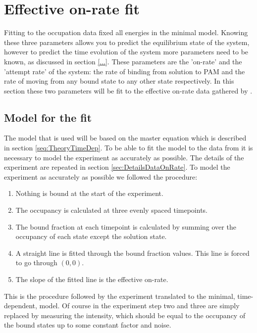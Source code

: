 \section{Effective on-rate fit}

Fitting to the occupation data fixed all energies in the minimal model. Knowing these three parameters allows you to predict the equilibrium state of the system, however to predict the time evolution of the system more parameters need to be known, as discussed in section \ref{...}. %
These parameters are the 'on-rate' and the 'attempt rate' of the system: the rate of binding from solution to PAM and the rate of moving from any bound state to any other state respectively. In this section these two parameters will be fit to the effective on-rate data gathered by \cite{PNAS}.


\subsection{Model for the fit}
The model that is used will be based on the master equation which is described in section \ref{seq:TheoryTimeDep}. To be able to fit the model to the data from \cite{PNAS} it is necessary to model the experiment as accurately as possible. The details of the experiment are repeated in section \ref{sec:DetailsDataOnRate}. To model the experiment as accurately as possible we followed the procedure:

\begin{enumerate}
\item Nothing is bound at the start of the experiment.
\item The occupancy is calculated at three evenly spaced timepoints.
\item The bound fraction at each timepoint is calculated by summing over the occupancy of each state except the solution state.
\item A straight line is fitted through the bound fraction values. This line is forced to go through $(0,0)$.
\item The slope of the fitted line is the effective on-rate.
\end{enumerate}

This is the procedure followed by the experiment translated to the minimal, time-dependent, model. Of course in the experiment step two and three are simply replaced by measuring the intensity, which should be equal to the occupancy of the bound states up to some constant factor and noise.

